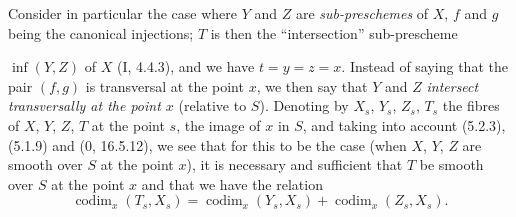 \begin{env}[17.13.7]\label{IV.17.13.7}
Consider in particular the case where $Y$ and $Z$ are \emph{sub-preschemes} of $X$, $f$ and $g$ being the canonical injections; $T$ is then the ``intersection'' sub-prescheme


$\inf(Y,Z)$ of $X$ (I, 4.4.3), and we have $t=y=z=x$. Instead of saying that the pair $(f,g)$ is transversal at the point $x$, we then say that $Y$ and $Z$ \emph{intersect transversally at the point $x$} (relative to $S$). Denoting by $X_s$, $Y_s$, $Z_s$, $T_s$ the fibres of $X$, $Y$, $Z$, $T$ at the point $s$, the image of $x$ in $S$, and taking into account (5.2.3), (5.1.9) and (0, 16.5.12), we see that for this to be the case (when $X$, $Y$, $Z$ are smooth over $S$ at the point $x$), it is necessary and sufficient that $T$ be smooth over $S$ at the point $x$ and that we have the relation
\[
\label{IV.17.13.7.1}
\tag{17.13.7.1}
\operatorname{codim}_x(T_s,X_s)=\operatorname{codim}_x(Y_s,X_s)+\operatorname{codim}_x(Z_s,X_s).
\]
\end{env}

